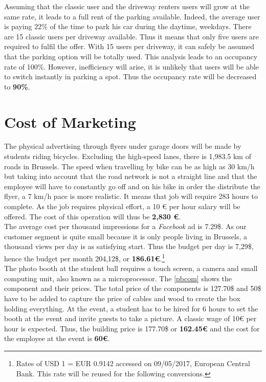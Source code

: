\documentclass[12pt,a4paper,oneside]{book}
\begin{document}
Assuming that the classic user and the driveway renters users will grow at the same rate, it leads to a full rent of the parking available. Indeed, the average user is paying 22\% of the time to park his car during the daytime, weekdays. There are 15 classic users per driveway available. Thus it means that only five users are required to fulfil the offer. With 15 users per driveway, it can safely be assumed that the parking option will be totally used. This analysis leads to an occupancy rate of 100\%. However, inefficiency will arise, it is unlikely that users will be able to switch instantly in parking a spot. Thus the occupancy rate will be decreased to \textbf{90\%}.

\section{Cost of Marketing}
\label{scom}

The physical advertising through flyers under garage doors will be made by students riding bicycles. Excluding the high-speed lanes, there is 1,983.5 km of roads in Brussels. The speed when travelling by bike can be as high as 30 km/h but taking into account that the road network is not a straight line and that the employee will have to constantly go off and on his bike in order the distribute the flyer, a 7 km/h pace is more realistic. It means that job will require 283 hours to complete. As the job requires physical effort, a 10 \euro{} per hour salary will be offered. The cost of this operation will thus be \textbf{2,830 \euro{}}.\\

The average cost per thousand impressions for a \textit{Facebook} ad is 7.29\$.\cite{fbad} As our customer segment is quite small because it is only people living in Brussels, a thousand views per day is as satisfying start. Thus the budget per day is 7,29\$, hence the budget per month 204,12\$, or \textbf{186.61\euro{}}.\footnote{Rates of USD 1 = EUR 0.9142 accessed on 09/05/2017, European Central Bank. This rate will be reused for the following conversions.}\\

The photo booth at the student ball requires a touch screen, a camera and small computing unit, also known as a microprocessor. The \autoref{pbcom} shows the component and their prices. The total price of the components is 127.70\$ and 50\$ have to be added to capture the price of cables and wood to create the box holding everything. At the event, a student has to be hired for 6 hours to set the booth at the event and invite guests to take a picture. A classic wage of 10\euro{} per hour is expected. Thus, the building price is 177.70\$ or \textbf{162.45\euro{}} and the cost for the employee at the event is \textbf{60\euro{}}.\\
\end{document}

